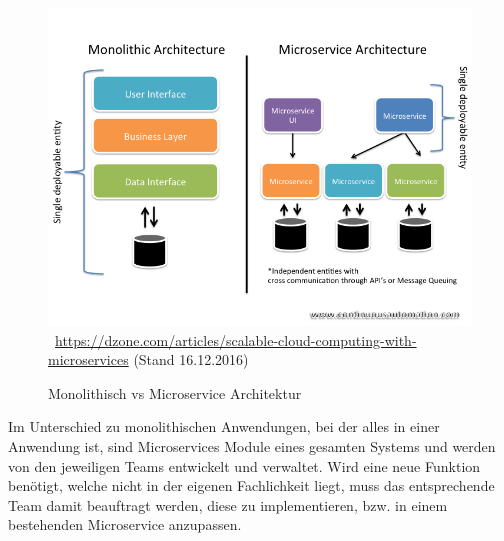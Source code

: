 \begin{figure}[htb]
	\centering 
	\includegraphics[width=\linewidth]{content/images/570495-slide1}\
	\quelle\url{https://dzone.com/articles/scalable-cloud-computing-with-microservices} (Stand 16.12.2016)
	\caption{Monolithisch vs Microservice Architektur\\}
	\label{fig:MonoVSMicroArchitektur} 
\end{figure}
\newpage
Im Unterschied zu monolithischen Anwendungen, bei der alles in einer Anwendung ist, sind Microservices Module eines gesamten Systems und werden von den jeweiligen Teams entwickelt und verwaltet. Wird eine neue Funktion benötigt, welche nicht in der eigenen Fachlichkeit liegt, muss das entsprechende Team damit beauftragt werden, diese zu implementieren, bzw. in einem bestehenden Microservice anzupassen.

